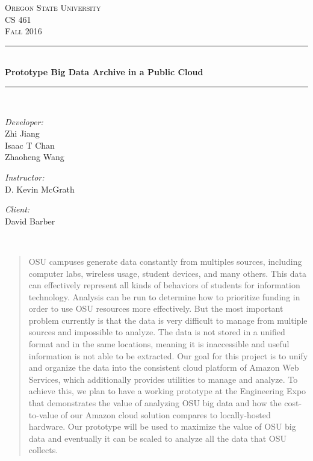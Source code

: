 \documentclass[letterpaper,10pt]{article}
\begin{document}
    \begin{titlepage}
    \newcommand{\HRule}{\rule{\linewidth}{0.5mm}}
    \center 
    \textsc{\Large Oregon State University}\\[1.5cm] 
    \textsc{\Large CS 461}\\[0.5cm] 
    \textsc{\Large Fall 2016}\\[0.5cm] 
    \HRule \\[0.4cm]
    { \huge \bfseries Prototype Big Data Archive in a Public Cloud}\\[0.4cm] %
    \HRule \\[1.5cm]
    \begin{minipage}{0.4\textwidth}
        \begin{flushleft} \large
        \emph{Developer:}\\
        Zhi Jiang\\
        Isaac T Chan\\
        Zhaoheng Wang
        \end{flushleft}
    \end{minipage}
    \begin{minipage}{0.4\textwidth}
        \begin{flushright} \large
        \emph{Instructor:} \\
        D. Kevin McGrath
        \end{flushright}
        \begin{flushright} \large
        \emph{Client:} \\
        David Barber
        \end{flushright}
    \end{minipage}\\[2cm]
    \begin{abstract}
    OSU campuses generate data constantly from multiples sources, including computer labs, wireless usage, student devices, and many others. This data can effectively represent all kinds of behaviors of students for information technology. Analysis can be run to determine how to prioritize funding in order to use OSU resources more effectively. But the most important problem currently is that the data is very difficult to manage from multiple sources and impossible to analyze. The data is not stored in a unified format and in the same locations, meaning it is inaccessible and useful information is not able to be extracted. Our goal for this project is to unify and organize the data into the consistent cloud platform of Amazon Web Services, which additionally provides utilities to manage and analyze. To achieve this, we plan to have a working prototype at the Engineering Expo that demonstrates the value of analyzing OSU big data and how the cost-to-value of our Amazon cloud solution compares to locally-hosted hardware. Our prototype will be used to maximize the value of OSU big data and eventually it can be scaled to analyze all the data that OSU collects.
    \end{abstract}
    \vfill %
    \end{titlepage}
	
\end{document}
